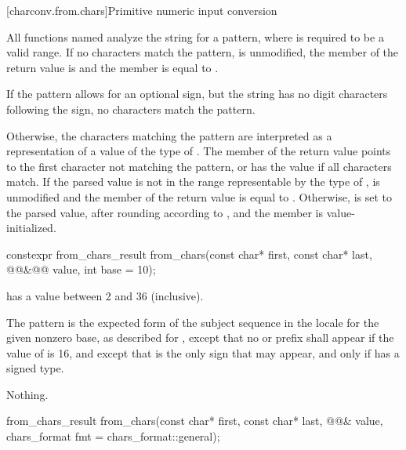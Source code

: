 
[charconv.from.chars]{Primitive numeric input conversion}

\pnum
All functions named 
analyze the string 
for a pattern,
where  is required to be a valid range.
If no characters match the pattern,
 is unmodified,
the member  of the return value is  and
the member  is equal to .
\begin{note}
If the pattern allows for an optional sign,
but the string has no digit characters following the sign,
no characters match the pattern.
\end{note}
Otherwise,
the characters matching the pattern
are interpreted as a representation
of a value of the type of .
The member 
of the return value
points to the first character
not matching the pattern,
or has the value 
if all characters match.
If the parsed value
is not in the range
representable by the type of ,
 is unmodified and
the member  of the return value
is equal to .
Otherwise,
 is set to the parsed value,
after rounding according to , and
the member  is value-initialized.

%
\begin{itemdecl}
constexpr from_chars_result from_chars(const char* first, const char* last,
                                       @@&@\itcorr[-1]@ value, int base = 10);
\end{itemdecl}

\begin{itemdescr}
\pnum
\expects
{} has a value between 2 and 36 (inclusive).

\pnum
\effects
The pattern is the expected form of the subject sequence
in the  locale
for the given nonzero base,
as described for ,
except that no  or  prefix shall appear
if the value of  is 16,
and except that 
is the only sign that may appear,
and only if  has a signed type.

\pnum
\throws
Nothing.
\end{itemdescr}

%
\begin{itemdecl}
from_chars_result from_chars(const char* first, const char* last, @@& value,
                             chars_format fmt = chars_format::general);
\end{itemdecl}


